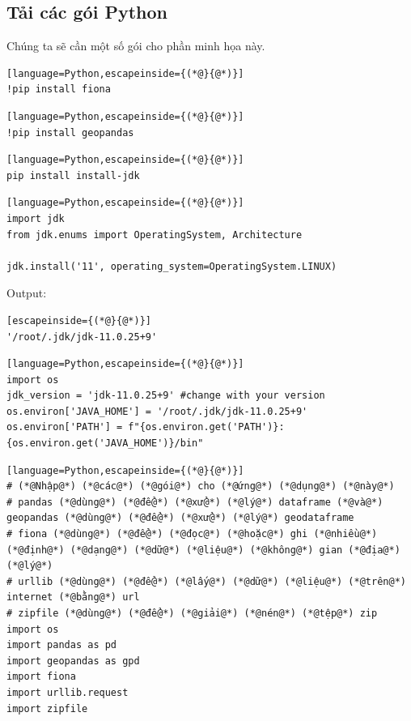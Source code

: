\subsection{Tải các gói Python}

Chúng ta sẽ cần một số gói cho phần minh họa này.

\begin{lstlisting}[language=Python,escapeinside={(*@}{@*)}]
!pip install fiona
\end{lstlisting}

\begin{lstlisting}[language=Python,escapeinside={(*@}{@*)}]
!pip install geopandas
\end{lstlisting}

\begin{lstlisting}[language=Python,escapeinside={(*@}{@*)}]
pip install install-jdk
\end{lstlisting}

\begin{lstlisting}[language=Python,escapeinside={(*@}{@*)}]
import jdk
from jdk.enums import OperatingSystem, Architecture

jdk.install('11', operating_system=OperatingSystem.LINUX)
\end{lstlisting}

Output:

\begin{lstlisting}[escapeinside={(*@}{@*)}]
'/root/.jdk/jdk-11.0.25+9'
\end{lstlisting}

\begin{lstlisting}[language=Python,escapeinside={(*@}{@*)}]
import os
jdk_version = 'jdk-11.0.25+9' #change with your version 
os.environ['JAVA_HOME'] = '/root/.jdk/jdk-11.0.25+9'
os.environ['PATH'] = f"{os.environ.get('PATH')}:{os.environ.get('JAVA_HOME')}/bin"
\end{lstlisting}

\begin{lstlisting}[language=Python,escapeinside={(*@}{@*)}]
# (*@Nhập@*) (*@các@*) (*@gói@*) cho (*@ứng@*) (*@dụng@*) (*@này@*)
# pandas (*@dùng@*) (*@để@*) (*@xử@*) (*@lý@*) dataframe (*@và@*) geopandas (*@dùng@*) (*@để@*) (*@xử@*) (*@lý@*) geodataframe
# fiona (*@dùng@*) (*@để@*) (*@đọc@*) (*@hoặc@*) ghi (*@nhiều@*) (*@định@*) (*@dạng@*) (*@dữ@*) (*@liệu@*) (*@không@*) gian (*@địa@*) (*@lý@*)
# urllib (*@dùng@*) (*@để@*) (*@lấy@*) (*@dữ@*) (*@liệu@*) (*@trên@*) internet (*@bằng@*) url
# zipfile (*@dùng@*) (*@để@*) (*@giải@*) (*@nén@*) (*@tệp@*) zip
import os
import pandas as pd
import geopandas as gpd
import fiona
import urllib.request
import zipfile
\end{lstlisting}

